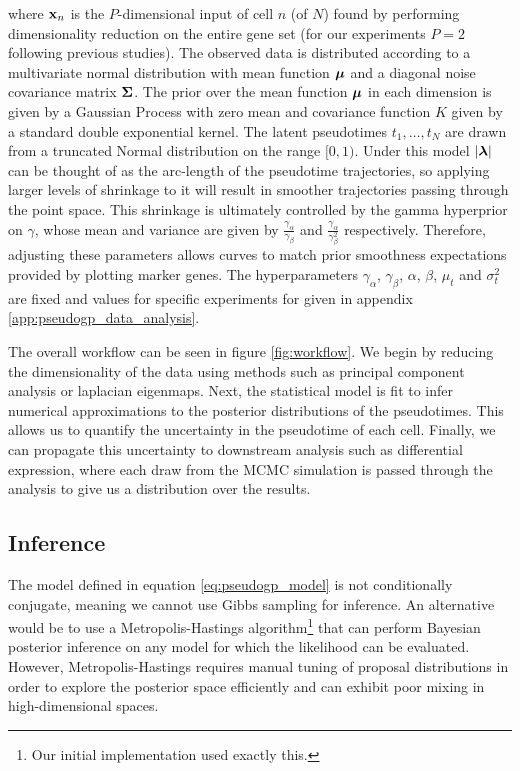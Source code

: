 where ${\bf x}_{n}$ is the $P$-dimensional input of cell $n$ (of $N$) found by performing dimensionality reduction on the entire gene set (for our experiments $P=2$ following previous studies).
The observed data is distributed according to a multivariate normal distribution with mean function ${\bm \mu}$ and a diagonal noise covariance matrix $\bm{\Sigma}$. The prior over the mean function ${\bm \mu}$ in each dimension is given by a Gaussian Process with zero mean and covariance function $K$ given by a standard double exponential kernel. The latent pseudotimes $t_1, \dots, t_N$ are drawn from a truncated Normal distribution on the range $[0, 1)$. Under this model $|\bm{\lambda}|$ can be thought of as the arc-length of the pseudotime trajectories, so applying larger levels of shrinkage to it will result in smoother trajectories passing through the point space. This shrinkage is ultimately controlled by the gamma hyperprior on $\gamma$, whose mean and variance are given by $\frac{\gamma_\alpha}{\gamma_\beta}$ and $\frac{\gamma_\alpha}{\gamma^2_\beta}$ respectively. Therefore, adjusting these parameters allows curves to match prior smoothness expectations provided by plotting marker genes. The hyperparameters $\gamma_\alpha$, $\gamma_\beta$, $\alpha$, $\beta$, $\mu_t$ and $\sigma_t^2$ are fixed and values for specific experiments for given in appendix \ref{app:pseudogp_data_analysis}.


The overall workflow can be seen in figure \ref{fig:workflow}. We begin by reducing the dimensionality of the data using methods such as principal component analysis or laplacian eigenmaps. Next, 	the statistical model is fit to infer numerical approximations to the posterior distributions of the pseudotimes. This allows us to quantify the uncertainty in the pseudotime of each cell. Finally, we can propagate this uncertainty to downstream analysis such as differential expression, where each draw from the MCMC simulation is passed through the analysis to give us a distribution over the results.

\subsection{Inference} \label{sec:stan}

The model defined in equation \ref{eq:pseudogp_model} is not conditionally conjugate, meaning we cannot use Gibbs sampling for inference. An alternative would be to use a Metropolis-Hastings algorithm\footnote{
Our initial implementation used exactly this.
} that can perform Bayesian posterior inference on any model for which the likelihood can be evaluated. However, Metropolis-Hastings requires manual tuning of proposal distributions in order to explore the posterior space efficiently and can exhibit poor mixing in high-dimensional spaces.


